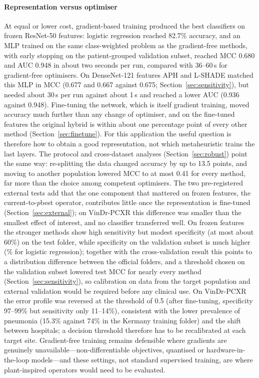 \documentclass[10pt,letterpaper]{article}
\begin{document}
\paragraph{Representation versus optimiser} At equal or lower cost, gradient-based training produced the best classifiers on frozen ResNet-50 features: logistic regression reached 82.7\% accuracy, and an MLP trained on the same class-weighted problem as the gradient-free methods, with early stopping on the patient-grouped validation subset, reached MCC 0.680 and AUC 0.948 in about two seconds per run, compared with 36--60\,s for gradient-free optimisers. On DenseNet-121 features APH and L-SHADE matched this MLP in MCC (0.677 and 0.667 against 0.675; Section~\ref{sec:sensitivity}), but needed about 30\,s per run against about 1\,s and reached a lower AUC (0.936 against 0.948). Fine-tuning the network, which is itself gradient training, moved accuracy much further than any change of optimiser, and on the fine-tuned features the original hybrid is within about one percentage point of every other method (Section~\ref{sec:finetune}). For this application the useful question is therefore how to obtain a good representation, not which metaheuristic trains the last layers. The protocol and cross-dataset analyses (Section~\ref{sec:robust}) point the same way: re-splitting the data changed accuracy by up to 13.5 points, and moving to another population lowered MCC to at most 0.41 for every method, far more than the choice among competent optimisers. The two pre-registered external tests add that the one component that mattered on frozen features, the current-to-$p$best operator, contributes little once the representation is fine-tuned (Section~\ref{sec:external}); on VinDr-PCXR this difference was smaller than the smallest effect of interest, and no classifier transferred well. On frozen features the stronger methods show high sensitivity but modest specificity (at most about 60\%) on the test folder, while specificity on the validation subset is much higher (\LRValSpec\% for logistic regression); together with the cross-validation result this points to a distribution difference between the official folders, and a threshold chosen on the validation subset lowered test MCC for nearly every method (Section~\ref{sec:sensitivity}), so calibration on data from the target population and external validation would be required before any clinical use. On VinDr-PCXR the error profile was reversed at the threshold of 0.5 (after fine-tuning, specificity 97--99\% but sensitivity only 11--14\%), consistent with the lower prevalence of pneumonia (15.3\% against 74\% in the Kermany training folder) and the shift between hospitals; a decision threshold therefore has to be recalibrated at each target site. Gradient-free training remains defensible where gradients are genuinely unavailable---non-differentiable objectives, quantised or hardware-in-the-loop models---and these settings, not standard supervised training, are where plant-inspired operators would need to be evaluated.
\end{document}
